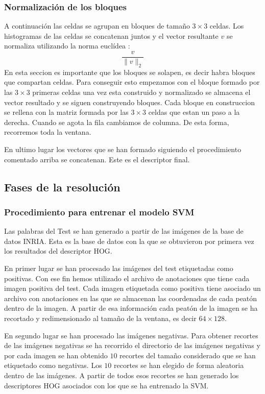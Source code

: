 \documentclass[a4paper,12pt]{article}
\begin{document}
\subsubsection{Normalización de los bloques}

A continuación las celdas se agrupan en bloques de tamaño
$3\times 3$ celdas. Los histogramas de las celdas se concatenan
juntos y el vector resultante $v$ se normaliza utilizando la
norma euclídea :
\[
  \frac{v}{\|v\|_2}
\]
En esta seccion es importante que los bloques se solapen, es
decir habra bloques que compartan celdas. Para conseguir esto
empezamos con el bloque formado por las $3\times 3$ primeras
celdas una vez esta construido y normalizado se almacena el
vector resultado y se siguen construyendo bloques. Cada bloque
en construccion se rellena con la matriz formada por las
$3\times 3$ celdas que estan un paso a la derecha. Cuando
se agota la fila cambiamos de columna. De esta forma,
recorremos toda la ventana.

En ultimo lugar los vectores que se han formado siguiendo el
procedimiento comentado arriba se concatenan. Este es el
descriptor final.

\subsection{Fases de la resolución}


\subsubsection{Procedimiento para entrenar el modelo SVM}

Las palabras del Test se han generado a partir de las imágenes de
la base de datos INRIA. Esta es la base de datos con la que se
obtuvieron por primera vez los resultados del descriptor HOG.

En primer lugar se han procesado las imágenes del test etiquetadas
como positivas. Con ese fin hemos utilizado el archivo de anotaciones
que tiene cada imagen positiva del test. Cada imagen etiquetada como
positiva tiene asociado un archivo con anotaciones en las que se almacenan
las coordenadas de cada peatón dentro de la imagen. A partir de esa
información cada peatón de la imagen se ha recortado y redimensionado
al tamaño de la ventana, es decir $64\times 128$.

En segundo lugar se han procesado las imágenes negativas. Para
obtener recortes de las imágenes negativas se ha recorrido el
directorio de las imágenes negativas y por cada imagen se han
obtenido $10$ recortes del tamaño considerado que se han etiquetado
como negativas. Los $10$ recortes se han elegido de forma aleatoria
dentro de las imágenes. A partir de todos esos recortes se han generado
los descriptores HOG asociados con los que se ha entrenado la SVM.
\end{document}
